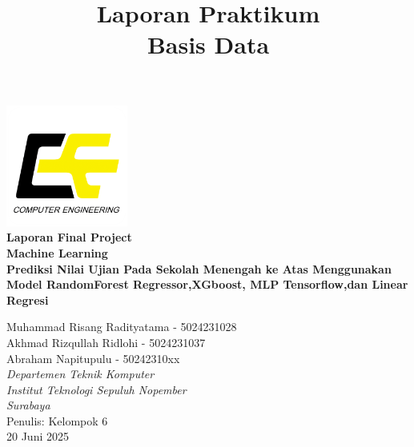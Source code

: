 \documentclass[a4paper,12pt]{report}
\title{Laporan Praktikum\\
Basis Data}
\author{}
\date{}
\begin{document}
\begin{titlepage}
    \centering

    \includegraphics[width=0.3\textwidth]{images/logo-tekkom.png}\\[1cm]

    {\Huge \textbf{Laporan Final Project}\\[0.3cm]}
    {\Huge \textbf{Machine Learning}}\\[1cm]
    
    {\Large \textbf{Prediksi Nilai Ujian Pada Sekolah Menengah ke Atas Menggunakan Model RandomForest Regressor,XGboost,
    MLP Tensorflow,dan Linear Regresi} \\[1cm]}

    {\Large {Muhammad Risang Radityatama - 5024231028}}\\[0.3cm]
    {\Large {Akhmad Rizqullah Ridlohi - 5024231037}}\\[0.3cm]
    {\Large {Abraham Napitupulu - 50242310xx}}\\[1cm]

    
    {\large \textit{Departemen Teknik Komputer}}\\
    {\large \textit{Institut Teknologi Sepuluh Nopember}}\\
    {\large \textit{Surabaya}}\\[0.3cm]

    \hfill Penulis: Kelompok 6\\
    \hfill 20 Juni 2025
\end{titlepage}

\tableofcontents
\clearpage












\end{document}
